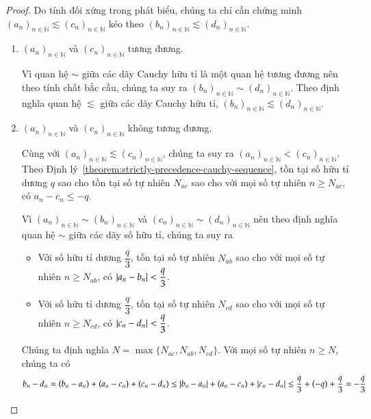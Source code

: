 \begin{proof}
    Do tính đối xứng trong phát biểu, chúng ta chỉ cần chứng minh ${(a_{n})}_{n\in\mathbb{N}}\lesssim {(c_{n})}_{n\in\mathbb{N}}$ kéo theo ${(b_{n})}_{n\in\mathbb{N}}\lesssim {(d_{n})}_{n\in\mathbb{N}}$.

    \begin{enumerate}[label={\textbf{Trường hợp \arabic*.}},itemindent=2cm]
        \item ${(a_{n})}_{n\in\mathbb{N}}$ và ${(c_{n})}_{n\in\mathbb{N}}$ tương đương.

              Vì quan hệ $\sim$ giữa các dãy Cauchy hữu tỉ là một quan hệ tương đương nên theo tính chất bắc cầu, chúng ta suy ra ${(b_{n})}_{n\in\mathbb{N}}\sim {(d_{n})}_{n\in\mathbb{N}}$. Theo định nghĩa quan hệ $\lesssim$ giữa các dãy Cauchy hữu tỉ, ${(b_{n})}_{n\in\mathbb{N}}\lesssim {(d_{n})}_{n\in\mathbb{N}}$.

        \item ${(a_{n})}_{n\in\mathbb{N}}$ và ${(c_{n})}_{n\in\mathbb{N}}$ không tương đương.

              Cùng với ${(a_{n})}_{n\in\mathbb{N}}\lesssim {(c_{n})}_{n\in\mathbb{N}}$, chúng ta suy ra ${(a_{n})}_{n\in\mathbb{N}} < {(c_{n})}_{n\in\mathbb{N}}$.  Theo Định lý~\ref{theorem:strictly-precedence-cauchy-sequence}, tồn tại số hữu tỉ dương $q$ sao cho tồn tại số tự nhiên $N_{ac}$ sao cho với mọi số tự nhiên $n\geq N_{ac}$, có $a_{n} - c_{n}\leq -q$.

              Vì ${(a_{n})}_{n\in\mathbb{N}}\sim {(b_{n})}_{n\in\mathbb{N}}$ và ${(c_{n})}_{n\in\mathbb{N}}\sim {(d_{n})}_{n\in\mathbb{N}}$ nên theo định nghĩa quan hệ $\sim$ giữa các dãy số hữu tỉ, chúng ta suy ra
              \begin{itemize}
                  \item Với số hữu tỉ dương $\dfrac{q}{3}$, tồn tại số tự nhiên $N_{ab}$ sao cho với mọi số tự nhiên $n\geq N_{ab}$, có $\left\vert{a_{n} - b_{n}}\right\vert < \dfrac{q}{3}$.
                  \item Với số hữu tỉ dương $\dfrac{q}{3}$, tồn tại số tự nhiên $N_{cd}$ sao cho với mọi số tự nhiên $n\geq N_{cd}$, có $\left\vert{c_{n} - d_{n}}\right\vert < \dfrac{q}{3}$.
              \end{itemize}

              Chúng ta định nghĩa $N = \max\{ N_{ac}, N_{ab}, N_{cd} \}$. Với mọi số tự nhiên $n\geq N$, chúng ta có
              \[
                  b_{n} - d_{n} = (b_{n} - a_{n}) + (a_{n} - c_{n}) + (c_{n} - d_{n}) \leq \left\vert{b_{n} - a_{n}}\right\vert + (a_{n} - c_{n}) + \left\vert{c_{n} - d_{n}}\right\vert \leq \frac{q}{3} + (-q) + \frac{q}{3} = -\frac{q}{3}
              \]


\end{enumerate}
\end{proof}
